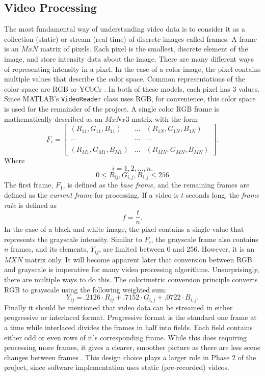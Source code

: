 \documentclass[12pt]{article} %
\begin{document}
\subsection{Video Processing}
The most fundamental way of understanding video data is to consider it as a collection (static) or stream (real-time) of discrete images called frames. A frame is an $MxN$ matrix of pixels. Each pixel is the smallest, discrete element of the image, and store intensity data about the image. There are many different ways of representing intensity in a pixel. In the case of a color image, the pixel contains multiple values that describe the color space. Common representations of the color space are RGB or YCbCr \cite{1}. In both of these models, each pixel has 3 values.  Since MATLAB's \texttt{VideoReader} class uses RGB, for convenience, this color space is used for the remainder of the project. A single color RGB frame is mathematically described as an $MxNx3$ matrix with the form
\begin{equation}
F_i = 
\begin{bmatrix}
(R_{11}, G_{11}, B_{11}) & ... & (R_{1N}, G_{1N}, B_{1N}) \\
 & &\\
... & ... & ... \\
 & &\\
(R_{M1}, G_{M1}, B_{M1}) & ... & (R_{MN}, G_{MN}, B_{MN}) 
\end{bmatrix}
.
\end{equation}
Where
\[
i = 1, 2, ... , n.
\]
\[
0 \leq R_{ij}, G_{i,j}, B_{i,j} \leq 256
\]
The first frame, $F_1$, is defined as the \textit{base frame}, and the remaining frames are defined as the \textit{current frame} for processing. If a video is $t$ seconds long, the \textit{frame rate }is defined as
\begin{equation}
f = \frac{t}{n}.
\label{eq:framerate}
\end{equation}
In the case of a black and white image, the pixel contains a single value that represents the grayscale intensity. Similar to $F_i$, the grayscale frame also contains $n$ frames, and its elements, $Y_{ij}$, are limited between 0 and 256. However, it is an $MXN$ matrix only. It will become apparent later that conversion between RGB and grayscale is imperative for many video processing algorithms. Unsurprisingly, there are multiple ways to do this. The colorimetric conversion principle converts RGB to grayscale using the following weighted sum:
\begin{equation}
Y_{ij} = .2126 \cdot R_{ij} + .7152 \cdot G_{i,j} + .0722 \cdot B_{i,j}.
\end{equation}
Finally it should be mentioned that video data can be streamed in either progressive or interlaced format. Progressive format is the standard one frame at a time while interlaced divides the frames in half into fields. Each field contains either odd or even rows of it's corresponding frame. While this does requiring processing more frames, it gives a clearer, smoother picture as there are less scene changes between frames \cite{1}. This design choice plays a larger role in Phase 2 of the project, since software implementation uses static (pre-recorded) videos.
\end{document}
